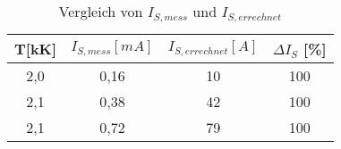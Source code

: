 \begin{table}[h]
	\begin{center}
		\begin{tabular}{cccc}
			T[kK]&$I_{S,mess}[mA]$&$I_{S,errechnet}[A]$&$\Delta I_S$ [\%] \\ \hline
			2,0&0,16&10&100 \\
			2,1&0,38&42&100 \\
			2,1&0,72&79&100
		\end{tabular}
		\caption{Vergleich von $I_{S,mess}$ und $I_{S,errechnet}$}
		\label{tablitis}
	\end{center}
\end{table}